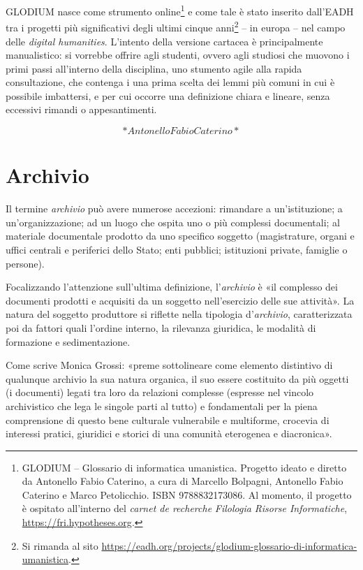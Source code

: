 \documentclass[
  b5paper,
  twoside,
  11pt,
  chapterprefix=false,
  bibliography=totocnumbered,
  listof=flat]{scrbook}
\begin{document}
GLODIUM nasce come strumento online\footnote{GLODIUM -- Glossario di informatica umanistica. Progetto ideato e
  diretto da Antonello Fabio Caterino, a cura di Marcello Bolpagni,
  Antonello Fabio Caterino e Marco Petolicchio. ISBN 9788832173086. Al
  momento, il progetto è ospitato all'interno del \emph{carnet de
  recherche} \emph{Filologia Risorse Informatiche},
  \href{https://fri.hypotheses.org/}{https://fri.hypotheses.org}.} e come tale è stato inserito
dall'EADH tra i progetti più significativi degli ultimi cinque anni\footnote{Si rimanda al sito
  \url{https://eadh.org/projects/glodium-glossario-di-informatica-umanistica}.}
-- in europa -- nel campo delle \emph{digital humanities}. L'intento della
versione cartacea è principalmente manualistico: si vorrebbe offrire
agli studenti, ovvero agli studiosi che muovono i primi passi
all'interno della disciplina, uno stumento agile alla rapida
consultazione, che contenga i una prima scelta dei lemmi più comuni in
cui è possibile imbattersi, e per cui occorre una definizione chiara e
lineare, senza eccessivi rimandi o appesantimenti.

\[*Antonello Fabio Caterino*\]

\mainmatter

\hypertarget{archivio}{%
\chapter{Archivio}\label{archivio}}

Il termine \emph{archivio} può avere numerose accezioni: rimandare a
un'istituzione; a un'organizzazione; ad un luogo che ospita uno o più
complessi documentali; al materiale documentale prodotto da uno
specifico soggetto (magistrature, organi e uffici centrali e periferici
dello Stato; enti pubblici; istituzioni private, famiglie o persone).

Focalizzando l'attenzione sull'ultima definizione, l'\emph{archivio} è «il
complesso dei documenti prodotti e acquisiti da un soggetto
nell'esercizio delle sue attività». La natura del soggetto produttore si
riflette nella tipologia d'\emph{archivio}, caratterizzata poi da fattori
quali l'ordine interno, la rilevanza giuridica, le modalità di
formazione e sedimentazione.

Come scrive Monica Grossi: «preme sottolineare come elemento distintivo
di qualunque archivio la sua natura organica, il suo essere costituito
da più oggetti (i documenti) legati tra loro da relazioni complesse
(espresse nel vincolo archivistico che lega le singole parti al tutto) e
fondamentali per la piena comprensione di questo bene culturale
vulnerabile e multiforme, crocevia di interessi pratici, giuridici e
storici di una comunità eterogenea e diacronica».
\end{document}
